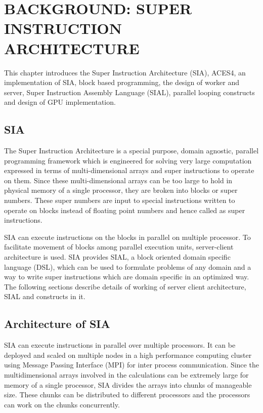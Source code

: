 \chapter{BACKGROUND: SUPER INSTRUCTION ARCHITECTURE} \label{background}

This chapter introduces the Super Instruction Architecture (SIA), ACES4, an
implementation of SIA, block based programming, the design of worker and server,
Super Instruction Assembly Language (SIAL), parallel looping constructs and
design of GPU implementation.

\section{SIA}
The Super Instruction Architecture is a special purpose, domain agnostic,
parallel programming framework which is engineered for solving very large
computation expressed in terms of multi-dimensional arrays and super
instructions to operate on them. Since these multi-dimensional arrays can be too
large to hold in physical memory of a single processor, they are broken into
blocks or super numbers. These super numbers are input to special instructions
written to operate on blocks instead of floating point numbers and hence called
as super instructions.

SIA can execute instructions on the blocks in parallel on multiple processor. To
facilitate movement of blocks among parallel execution units, server-client
architecture is used. SIA provides SIAL, a block oriented domain specific
language (DSL), which can be used to formulate problems of any domain and a way
to write super instructions which are domain specific in an optimized way. The
following sections describe details of working of server client architecture,
SIAL and constructs in it.

\section{Architecture of SIA}
SIA can execute instructions in parallel over multiple processors. It can be
deployed and scaled on multiple nodes in a high performance computing cluster
using Message Passing Interface (MPI) for inter process communication. Since the
multidimensional arrays involved in the calculations can be extremely large for
memory of a single processor, SIA divides the arrays into chunks of
manageable size. These chunks can be distributed to different processors and the
processors can work on the chunks concurrently.


